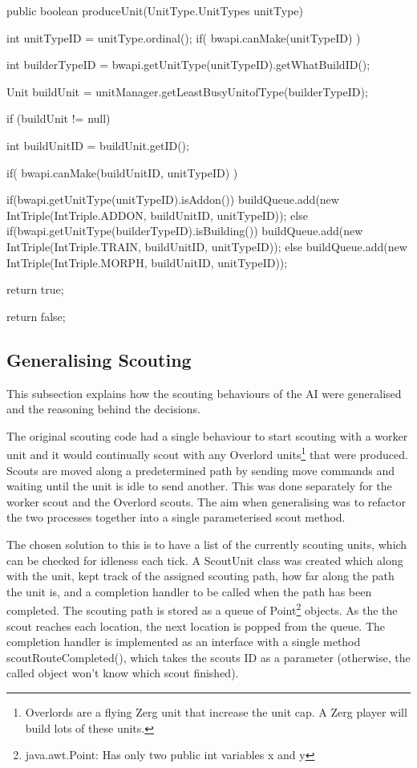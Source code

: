 \documentclass[11pt,openright,a4paper]{report}
\begin{document}
\begin{Code}[frame=single,language=Java,tabsize=4,breaklines,breakatwhitespace,caption={The current method to produce any unit in the game. IntTriple is a custom type that simply contains three public integers.},label=produceUnit]
public boolean produceUnit(UnitType.UnitTypes unitType){
	int unitTypeID = unitType.ordinal();
	if( bwapi.canMake(unitTypeID) ){
		int builderTypeID = bwapi.getUnitType(unitTypeID).getWhatBuildID();
		
        Unit buildUnit = unitManager.getLeastBusyUnitofType(builderTypeID);
		
		if (buildUnit != null){
			int buildUnitID = buildUnit.getID();
			
			if( bwapi.canMake(buildUnitID, unitTypeID) ){					
				if(bwapi.getUnitType(unitTypeID).isAddon()){
					buildQueue.add(new IntTriple(IntTriple.ADDON, buildUnitID, unitTypeID));
				}
				else if(bwapi.getUnitType(builderTypeID).isBuilding()){
					buildQueue.add(new IntTriple(IntTriple.TRAIN, buildUnitID, unitTypeID));
				}
				else{
					buildQueue.add(new IntTriple(IntTriple.MORPH, buildUnitID, unitTypeID));
				}
				
				return true;
			}
		}
	}
	return false;
}
\end{Code} 

\subsection{Generalising Scouting}
This subsection explains how the scouting behaviours of the AI were generalised and the reasoning behind the decisions.

The original scouting code had a single behaviour to start scouting with a worker unit and it would continually scout with any Overlord units\footnote{Overlords are a flying Zerg unit that increase the unit cap. A Zerg player will build lots of these units.} that were produced. Scouts are moved along a predetermined path by sending move commands and waiting until the unit is idle to send another. This was done separately for the worker scout and the Overlord scouts. The aim when generalising was to refactor the two processes together into a single parameterised scout method.

The chosen solution to this is to have a list of the currently scouting units, which can be checked for idleness each tick. A ScoutUnit class was created which along with the unit, kept track of the assigned scouting path, how far along the path the unit is, and a completion handler to be called when the path has been completed. The scouting path is stored as a queue of Point\footnote{java.awt.Point: Has only two public int variables x and y} objects. As the the scout reaches each location, the next location is popped from the queue. The completion handler is implemented as an interface with a single method scoutRouteCompleted(), which takes the scouts ID as a parameter (otherwise, the called object won't know which scout finished).
\end{document}
